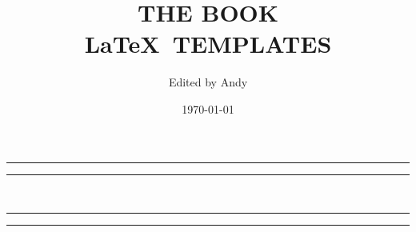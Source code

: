 \documentclass[openany,twoside,12pt]{book}
\title{THE BOOK \\[8pt] \LaTeX ~TEMPLATES}
\author{Edited by Andy}
\date{\today}
\theoremstyle{plain}
\numberwithin{equation}{chapter}
\numberwithin{figure}{chapter}
\numberwithin{table}{chapter}
\begin{document}



\begin{titlepage} %


	\centering %
	
	\scshape %
	
	\vspace*{2\baselineskip} %
	
	
	\rule{\textwidth}{1.6pt}\vspace*{-\baselineskip}\vspace*{2pt} %
	\rule{\textwidth}{0.4pt} %
	
	\vspace{0.75\baselineskip} %
	
    \makeatletter

	{\LARGE\bfseries \@title \\} %
	
	\vspace{0.75\baselineskip} %
	
	\rule{\textwidth}{0.4pt}\vspace*{-\baselineskip}\vspace{3.2pt} %
	\rule{\textwidth}{1.6pt} %
	
	\vspace{2\baselineskip} %
	
	

	
	\vspace*{3\baselineskip} %
	

\end{titlepage}
\end{document}
